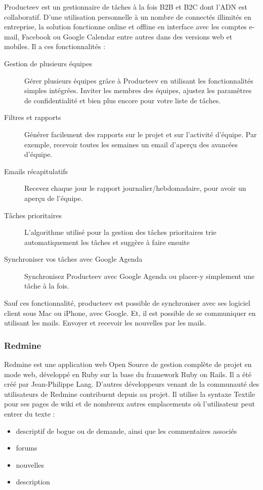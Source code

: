 Producteev est un gestionnaire de tâches à la fois B2B et B2C dont l’ADN est collaboratif. D’une utilisation personnelle à un nombre de connectés illimités en entreprise, la solution fonctionne online et offline en interface avec les comptes e-mail, Facebook ou Google Calendar entre autres dans des versions web et mobiles. Il a ces fonctionnalités :
\begin{description}
	\item[Gestion de plusieurs équipes] Gérer plusieurs équipes grâce à Producteev en utilisant les fonctionnalités simples intégrées. Inviter les membres des équipes, ajustez les paramètres de confidentialité et bien plus encore pour votre liste de tâches.
	\item[Filtres et rapports] Générer facilement des rapports sur le projet et sur l'activité d'équipe. Par exemple, recevoir toutes les semaines un email d'aperçu des avancées d'équipe.
	\item[Emails récapitulatifs] Recevez chaque jour le rapport journalier/hebdomadaire, pour avoir un aperçu de l'équipe.
	\item[Tâches prioritaires]  L'algorithme utilisé pour la gestion des tâches prioritaires trie automatiquement les tâches et  suggère à faire ensuite
	\item[Synchroniser vos tâches avec Google Agenda] Synchronisez Producteev avec Google Agenda ou placer-y simplement une tâche à la fois. 
\end{description}

Sauf ces fonctionnalité, producteev est possible de synchroniser avec ses logiciel client sous Mac ou iPhone, avec Google. Et, il est possible de se communiquer en utilisant les mails. Envoyer et recevoir les nouvelles par les mails. 


\subsubsection{Redmine} %
\label{ssub:redmine}


Redmine est une application web Open Source de gestion complète de projet en mode web, développé en Ruby sur la base du framework Ruby on Rails.
Il a été créé par Jean-Philippe Lang. D'autres développeurs venant de la communauté des utilisateurs de Redmine contribuent depuis au projet. Il utilise la syntaxe Textile pour ses pages de wiki et de nombreux autres emplacements où l'utilisateur peut entrer du texte : 
\begin{itemize}
	\item descriptif de bogue ou de demande, ainsi que les commentaires associés
	\item forums
	\item nouvelles
	\item description
\end{itemize}


